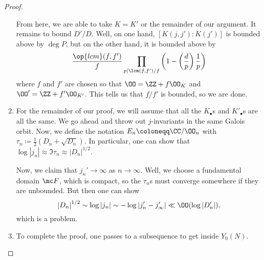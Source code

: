 \documentclass[../notes.tex]{subfiles}
\begin{document}
\begin{proof}
\begin{enumerate}
		From here, we are able to take $K=K'$ or the remainder of our argument. It remains to bound $D'/D$. Well, on one hand, $[K(j,j'):K(j')]$ is bounded above by $\deg P$, but on the other hand, it is bounded above by
		\[\frac{\op{lcm}(f,f')}{f}\prod_{p\mid\lcm(f,f')/f}\left(1-\left(\frac dp\right)\frac1p\right)\]
		where $f$ and $f'$ are chosen so that $\OO=\ZZ+f\OO_K$ and $\OO'=\ZZ+f'\OO_{K'}$. This tells us that $f/f'$ is bounded, so we are done.

		\item For the remainder of our proof, we will assume that all the $K_\bullet$s and $K'_\bullet$s are all the same. We go ahead and throw out $j$-invariants in the same Galois orbit. Now, we define the notation $E_n\coloneqq\CC/\OO_n$ with $\tau_n\coloneqq\frac12(D_n+\sqrt{D_n})$. In particular, one can show that $\log\left|j_n\right|\approx\Im\tau_n\approx\left|D_n\right|^{1/2}$.

		Now, we claim that $j_n'\to\infty$ as $n\to\infty$. Well, we choose a fundamental domain $\mc F$, which is compact, so the $\tau_n$s must converge somewhere if they are unbounded. But then one can show
		\[\left|D_n\right|^{1/2}\sim\log\left|j_n\right|\sim-\log\left|j_n'-j_\infty'\right|\ll\OO(\log\left|D_n'\right|),\]
		which is a problem.

		\item To complete the proof, one passes to a subsequence to get inside $Y_0(N)$.
		\qedhere
	\end{enumerate}
\end{proof}
\end{document}
